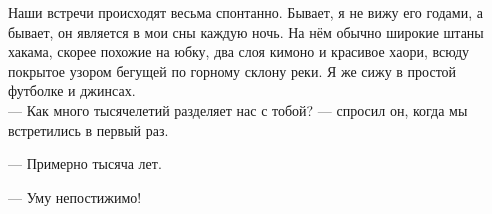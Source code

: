 \documentclass[openany, oneside]{book}
\begin{document}
Наши встречи происходят весьма спонтанно. Бывает, я не вижу его годами, а бывает, он является в мои сны каждую ночь. На нём обычно широкие штаны хакама, скорее похожие на юбку, два слоя кимоно и красивое хаори, всюду покрытое узором бегущей по горному склону реки. Я же сижу в простой футболке и джинсах.\\

--- Как много тысячелетий разделяет нас с тобой? --- спросил он, когда мы встретились в первый раз.

--- Примерно тысяча лет.

--- Уму непостижимо! 
\end{document}
